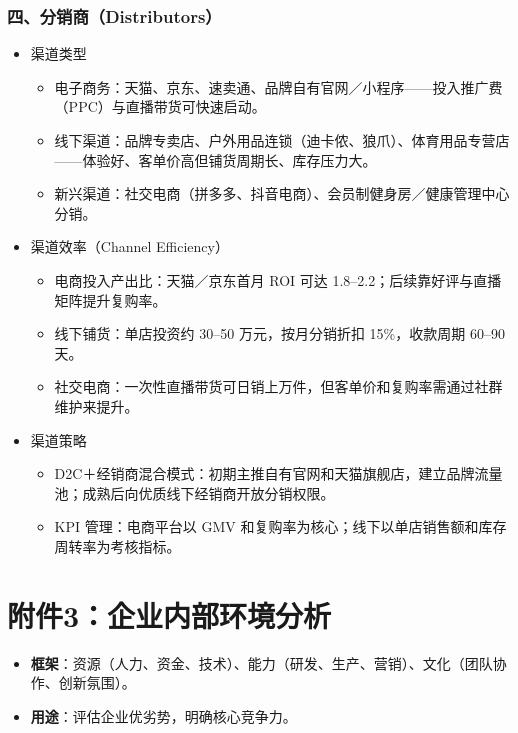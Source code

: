 \documentclass[UTF8]{report}
\theoremstyle{MyLineTheoremStyle} %
\theoremstyle{MyBlockTheoremStyle} %
\theoremstyle{MySubsubsectionStyle} %
\begin{document}
\subsubsection{四、分销商（Distributors）}
    \begin{itemize}
      \item 渠道类型
        \begin{itemize}
          \item 电子商务：天猫、京东、速卖通、品牌自有官网／小程序——投入推广费（PPC）与直播带货可快速启动。
          \item 线下渠道：品牌专卖店、户外用品连锁（迪卡侬、狼爪）、体育用品专营店——体验好、客单价高但铺货周期长、库存压力大。
          \item 新兴渠道：社交电商（拼多多、抖音电商）、会员制健身房／健康管理中心分销。
        \end{itemize}
      \item 渠道效率（Channel Efficiency）
        \begin{itemize}
          \item 电商投入产出比：天猫／京东首月 ROI 可达 1.8–2.2；后续靠好评与直播矩阵提升复购率。
          \item 线下铺货：单店投资约 30–50 万元，按月分销折扣 15\%，收款周期 60–90 天。
          \item 社交电商：一次性直播带货可日销上万件，但客单价和复购率需通过社群维护来提升。
        \end{itemize}
      \item 渠道策略
        \begin{itemize}
          \item D2C＋经销商混合模式：初期主推自有官网和天猫旗舰店，建立品牌流量池；成熟后向优质线下经销商开放分销权限。
          \item KPI 管理：电商平台以 GMV 和复购率为核心；线下以单店销售额和库存周转率为考核指标。
        \end{itemize}
    \end{itemize}


\section{附件3：企业内部环境分析}
\begin{itemize}
    \item \textbf{框架}：资源（人力、资金、技术）、能力（研发、生产、营销）、文化（团队协作、创新氛围）。
    \item \textbf{用途}：评估企业优劣势，明确核心竞争力。
\end{itemize}
\end{document}
